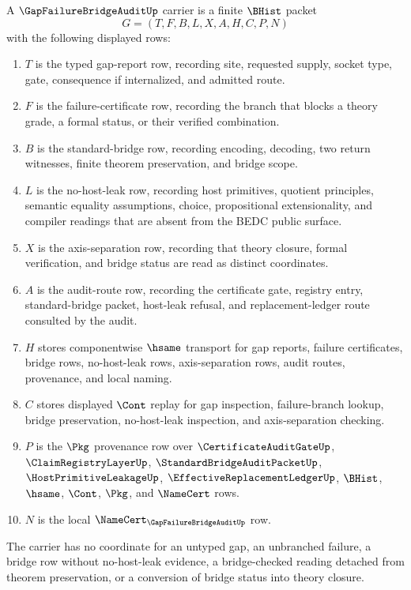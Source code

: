 \begin{definition}
\label{def:gap-failure-bridge-audit-carrier}
A $\GapFailureBridgeAuditUp$ carrier is a finite $\BHist$ packet
$$
G=(T,F,B,L,X,A,H,C,P,N)
$$
with the following displayed rows:
\begin{enumerate}
\item $T$ is the typed gap-report row, recording site, requested supply, socket type, gate, consequence if internalized, and admitted route.
\item $F$ is the failure-certificate row, recording the branch that blocks a theory grade, a formal status, or their verified combination.
\item $B$ is the standard-bridge row, recording encoding, decoding, two return witnesses, finite theorem preservation, and bridge scope.
\item $L$ is the no-host-leak row, recording host primitives, quotient principles, semantic equality assumptions, choice, propositional extensionality, and compiler readings that are absent from the BEDC public surface.
\item $X$ is the axis-separation row, recording that theory closure, formal verification, and bridge status are read as distinct coordinates.
\item $A$ is the audit-route row, recording the certificate gate, registry entry, standard-bridge packet, host-leak refusal, and replacement-ledger route consulted by the audit.
\item $H$ stores componentwise $\hsame$ transport for gap reports, failure certificates, bridge rows, no-host-leak rows, axis-separation rows, audit routes, provenance, and local naming.
\item $C$ stores displayed $\Cont$ replay for gap inspection, failure-branch lookup, bridge preservation, no-host-leak inspection, and axis-separation checking.
\item $P$ is the $\Pkg$ provenance row over $\CertificateAuditGateUp$, $\ClaimRegistryLayerUp$, $\StandardBridgeAuditPacketUp$, $\HostPrimitiveLeakageUp$, $\EffectiveReplacementLedgerUp$, $\BHist$, $\hsame$, $\Cont$, $\Pkg$, and $\NameCert$ rows.
\item $N$ is the local $\NameCert_{\GapFailureBridgeAuditUp}$ row.
\end{enumerate}
The carrier has no coordinate for an untyped gap, an unbranched failure, a bridge row without no-host-leak evidence, a bridge-checked reading detached from theorem preservation, or a conversion of bridge status into theory closure.
\end{definition}

